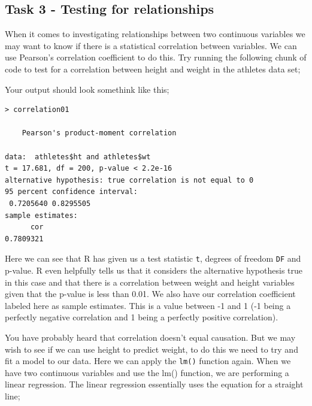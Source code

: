 \documentclass[
]{book}
\newenvironment{Shaded}{\begin{snugshade}}{\end{snugshade}}
\newcommand{\AttributeTok}[1]{\textcolor[rgb]{0.13,0.29,0.53}{#1}}
\newcommand{\CommentTok}[1]{\textcolor[rgb]{0.56,0.35,0.01}{\textit{#1}}}
\newcommand{\FunctionTok}[1]{\textcolor[rgb]{0.13,0.29,0.53}{\textbf{#1}}}
\newcommand{\NormalTok}[1]{#1}
\newcommand{\OtherTok}[1]{\textcolor[rgb]{0.56,0.35,0.01}{#1}}
\newcommand{\SpecialCharTok}[1]{\textcolor[rgb]{0.81,0.36,0.00}{\textbf{#1}}}
\newcommand{\StringTok}[1]{\textcolor[rgb]{0.31,0.60,0.02}{#1}}
\begin{document}
\subsection{Task 3 - Testing for relationships}\label{task-3---testing-for-relationships}

When it comes to investigating relationships between two continuous variables we may want to know if there is a statistical correlation between variables. We can use Pearson's correlation coefficient to do this. Try running the following chunk of code to test for a correlation between height and weight in the athletes data set;

\begin{Shaded}
\end{Shaded}

Your output should look somethink like this;

\begin{verbatim}
> correlation01

    Pearson's product-moment correlation

data:  athletes$ht and athletes$wt
t = 17.681, df = 200, p-value < 2.2e-16
alternative hypothesis: true correlation is not equal to 0
95 percent confidence interval:
 0.7205640 0.8295505
sample estimates:
      cor 
0.7809321 
\end{verbatim}

Here we can see that R has given us a test statistic \texttt{t}, degrees of freedom \texttt{DF} and p-value. R even helpfully tells us that it considers the alternative hypothesis true in this case and that there is a correlation between weight and height variables given that the p-value is less than 0.01. We also have our correlation coefficient labeled here as sample estimates. This is a value between -1 and 1 (-1 being a perfectly negative correlation and 1 being a perfectly positive correlation).

You have probably heard that correlation doesn't equal causation. But we may wish to see if we can use height to predict weight, to do this we need to try and fit a model to our data. Here we can apply the \texttt{lm()} function again. When we have two continuous variables and use the lm() function, we are performing a linear regression. The linear regression essentially uses the equation for a straight line;
\end{document}
